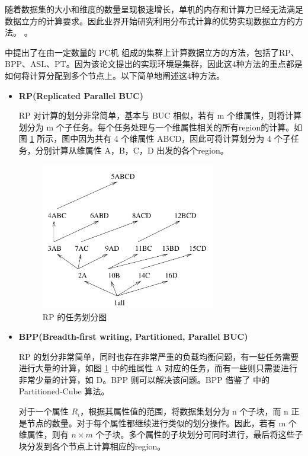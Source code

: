 随着数据集的大小和维度的数量呈现极速增长，单机的内存和计算力已经无法满足数据立方的计算要求。因此业界开始研究利用分布式计算的优势实现数据立方的方法。\cite{nandi2011distributed} \cite{dehne2006cgmcube} \cite{ng2001iceberg} \cite{lee2012efficient}。

\cite{ng2001iceberg} 中提出了在由一定数量的 PC机 组成的集群上计算数据立方的方法，包括了RP、BPP、ASL、PT。因为该论文提出的实现环境是集群，因此这4种方法的重点都是如何将计算分配到多个节点上。以下简单地阐述这4种方法。

\begin{itemize}

\item \textbf{RP(Replicated Parallel BUC)}

RP 对计算的划分非常简单，基本与 BUC 相似，若有 m 个维属性，则将计算划分为 m 个子任务。每个任务处理与一个维属性相关的所有region的计算。如图 \ref{cluster_rp} 所示，图中因为共有 4 个维属性 ABCD，因此可将计算划分为 4 个子任务，分别计算从维属性 A，B，C，D 出发的各个region。

\begin{figure}[!htb]
\centering\includegraphics[width=3in]{picture/ch_current_research/cluster_rp} 
\caption{RP 的任务划分图}\label{cluster_rp} 
\end{figure} 

\item \textbf{BPP(Breadth-first writing, Partitioned, Parallel BUC)}

RP 的划分非常简单，同时也存在非常严重的负载均衡问题，有一些任务需要进行大量的计算，如图 \ref{cluster_rp} 中的维属性 A 对应的任务，而有一些则只需要进行非常少量的计算，如 D。BPP 则可以解决该问题。BPP 借鉴了 \cite{ross1997fast} 中的 Partitioned-Cube 算法。

对于一个属性 ${R}_{i}$，根据其属性值的范围，将数据集划分为 n 个子块，而 n 正是节点的数量。对于每个属性都继续进行类似的划分操作。因此，若有 m 个维属性，则有 $n \times m$ 个子块。多个属性的子块划分可同时进行，最后将这些子块分发到各个节点上计算相应的region。


\end{itemize}

